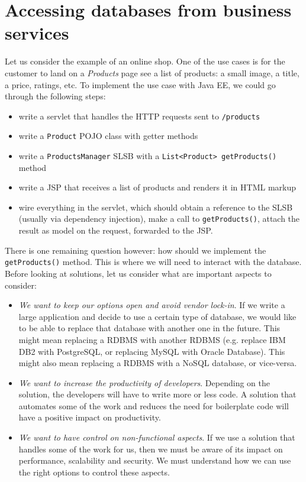 \section{Accessing databases from business services}

Let us consider the example of an online shop. One of the use cases is for the customer to land on a \emph{Products} page see a list of products: a small image, a title, a price, ratings, etc. To implement the use case with Java EE, we could go through the following steps:

\begin{itemize}
\item write a servlet that handles the HTTP requests sent to \texttt{/products}
\item write a \texttt{Product} \ac{POJO} class with getter methods
\item write a \texttt{ProductsManager} \ac{SLSB} with a \texttt{List<Product> getProducts()} method
\item write a \ac{JSP} that receives a list of products and renders it in HTML markup
\item wire everything in the servlet, which should obtain a reference to the \ac{SLSB} (usually via dependency injection), make a call to \texttt{getProducts()}, attach the result as model on the request, forwarded to the \ac{JSP}.
\end{itemize}

There is one remaining question however: how should we implement the \texttt{getProducts()} method. This is where we will need to interact with the database. Before looking at solutions, let us consider what are important aspects to consider:

\begin{itemize}
\item \emph{We want to keep our options open and avoid vendor lock-in}. If we write a large application and decide to use a certain type of database, we would like to be able to replace that database with another one in the future. This might mean replacing a \ac{RDBMS} with another \ac{RDBMS} (e.g. replace IBM DB2 with PostgreSQL, or replacing MySQL with Oracle Database). This might also mean replacing a \ac{RDBMS} with a NoSQL database, or vice-versa.
\item \emph{We want to increase the productivity of developers}. Depending on the solution, the developers will have to write more or less code. A solution that automates some of the work and reduces the need for boilerplate code will have a positive impact on productivity. 
\item \emph{We want to have control on non-functional aspects}. If we use a solution that handles some of the work for us, then we must be aware of its impact on performance, scalability and security. We must understand how we can use the right options to control these aspects.
\end{itemize}

